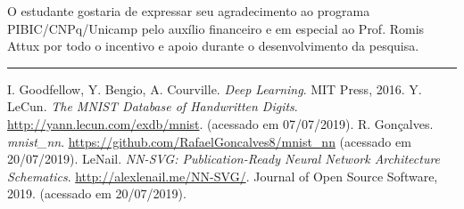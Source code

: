 \documentclass[a0,portrait]{a0poster}
\begin{document}
\begin{multicols}{2}
{    O estudante gostaria de expressar seu agradecimento ao programa PIBIC/CNPq/Unicamp pelo auxílio financeiro e em especial ao Prof. Romis Attux por todo o incentivo e apoio durante o desenvolvimento da pesquisa.

    }

    \rule{.33\linewidth}{2pt}

{\large
\begin{thebibliography}{9}
        I. Goodfellow, Y. Bengio, A. Courville.
        \textit{Deep Learning}.
        MIT Press, 2016.
        Y. LeCun.
        \textit{The MNIST Database of Handwritten Digits}.
        \url{http://yann.lecun.com/exdb/mnist}.
        (acessado em 07/07/2019).
        R. Gonçalves.
        \textit{mnist\_nn}.
        \url{https://github.com/RafaelGoncalves8/mnist_nn}
        (acessado em 20/07/2019).
        LeNail.
        \textit{NN-SVG: Publication-Ready Neural Network Architecture Schematics}.
        \url{http://alexlenail.me/NN-SVG/}.
        Journal of Open Source Software, 2019.
        (acessado em 20/07/2019).
\end{thebibliography}
}
\end{multicols}
\end{document}
